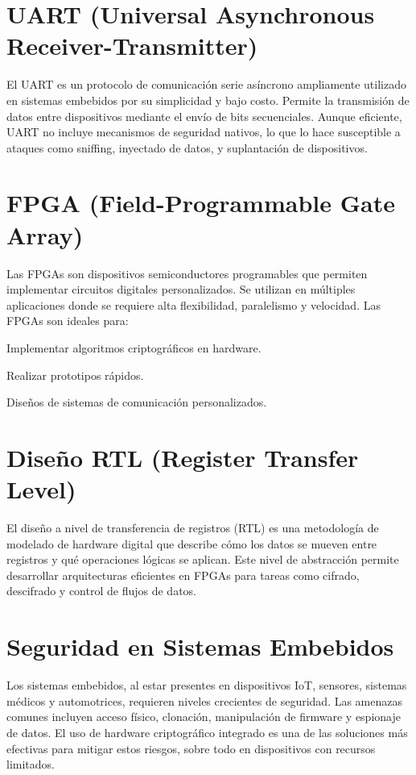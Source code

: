 \section{UART (Universal Asynchronous Receiver-Transmitter)}
El UART es un protocolo de comunicación serie asíncrono ampliamente utilizado en sistemas embebidos por su simplicidad y bajo costo. Permite la transmisión de datos entre dispositivos mediante el envío de bits secuenciales. Aunque eficiente, UART no incluye mecanismos de seguridad nativos, lo que lo hace susceptible a ataques como sniffing, inyectado de datos, y suplantación de dispositivos.

\section{FPGA (Field-Programmable Gate Array)}
Las FPGAs son dispositivos semiconductores programables que permiten implementar circuitos digitales personalizados. Se utilizan en múltiples aplicaciones donde se requiere alta flexibilidad, paralelismo y velocidad. Las FPGAs son ideales para:

Implementar algoritmos criptográficos en hardware.

Realizar prototipos rápidos.

Diseños de sistemas de comunicación personalizados.

\section{Diseño RTL (Register Transfer Level)}
El diseño a nivel de transferencia de registros (RTL) es una metodología de modelado de hardware digital que describe cómo los datos se mueven entre registros y qué operaciones lógicas se aplican. Este nivel de abstracción permite desarrollar arquitecturas eficientes en FPGAs para tareas como cifrado, descifrado y control de flujos de datos.

\section{Seguridad en Sistemas Embebidos}
Los sistemas embebidos, al estar presentes en dispositivos IoT, sensores, sistemas médicos y automotrices, requieren niveles crecientes de seguridad. Las amenazas comunes incluyen acceso físico, clonación, manipulación de firmware y espionaje de datos. El uso de hardware criptográfico integrado es una de las soluciones más efectivas para mitigar estos riesgos, sobre todo en dispositivos con recursos limitados.

